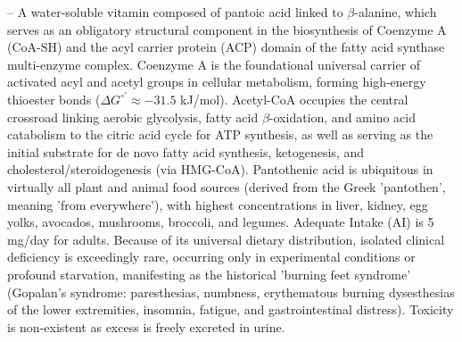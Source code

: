 -- A water-soluble vitamin composed of pantoic acid linked to $\beta$-alanine, which serves as an obligatory structural component in the biosynthesis of Coenzyme A (CoA-SH) and the acyl carrier protein (ACP) domain of the fatty acid synthase multi-enzyme complex. Coenzyme A is the foundational universal carrier of activated acyl and acetyl groups in cellular metabolism, forming high-energy thioester bonds ($\Delta G^{\circ\prime} \approx -31.5$ kJ/mol). Acetyl-CoA occupies the central crossroad linking aerobic glycolysis, fatty acid $\beta$-oxidation, and amino acid catabolism to the citric acid cycle for ATP synthesis, as well as serving as the initial substrate for de novo fatty acid synthesis, ketogenesis, and cholesterol/steroidogenesis (via HMG-CoA). Pantothenic acid is ubiquitous in virtually all plant and animal food sources (derived from the Greek 'pantothen', meaning 'from everywhere'), with highest concentrations in liver, kidney, egg yolks, avocados, mushrooms, broccoli, and legumes. Adequate Intake (AI) is 5 mg/day for adults. Because of its universal dietary distribution, isolated clinical deficiency is exceedingly rare, occurring only in experimental conditions or profound starvation, manifesting as the historical 'burning feet syndrome' (Gopalan's syndrome: paresthesias, numbness, erythematous burning dysesthesias of the lower extremities, insomnia, fatigue, and gastrointestinal distress). Toxicity is non-existent as excess is freely excreted in urine.

